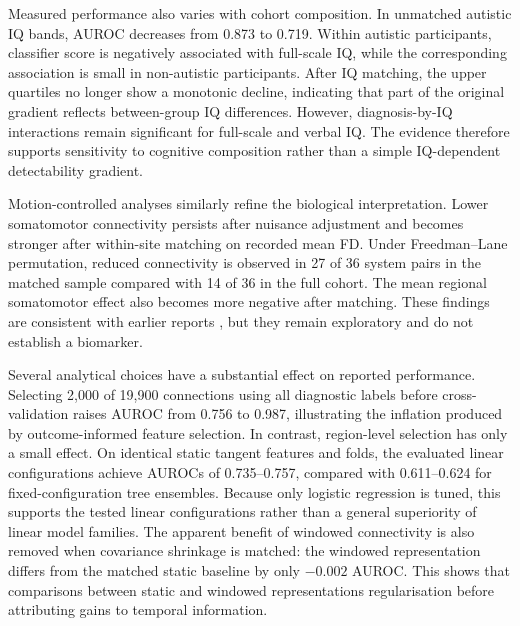 Measured performance also varies with cohort composition. In unmatched autistic IQ bands, AUROC decreases from 0.873 to 0.719. Within autistic participants, classifier score is negatively associated with full-scale IQ, while the corresponding association is small in non-autistic participants. After IQ matching, the upper quartiles no longer show a monotonic decline, indicating that part of the original gradient reflects between-group IQ differences. However, diagnosis-by-IQ interactions remain significant for full-scale and verbal IQ. The evidence therefore supports sensitivity to cognitive composition rather than a simple IQ-dependent detectability gradient.

Motion-controlled analyses similarly refine the biological interpretation. Lower somatomotor connectivity persists after nuisance adjustment and becomes stronger after within-site matching on recorded mean FD. Under Freedman--Lane permutation, reduced connectivity is observed in 27 of 36 system pairs in the matched sample compared with 14 of 36 in the full cohort. The mean regional somatomotor effect also becomes more negative after matching. These findings are consistent with earlier reports \citep{Chenetal2015,Holigaetal2019,Ilioskaetal2023}, but they remain exploratory and do not establish a biomarker.

Several analytical choices have a substantial effect on reported performance. Selecting 2,000 of 19,900 connections using all diagnostic labels before cross-validation raises AUROC from 0.756 to 0.987, illustrating the inflation produced by outcome-informed feature selection. In contrast, region-level selection has only a small effect.  On identical static tangent features and folds, the evaluated linear configurations achieve AUROCs of 0.735--0.757, compared with 0.611--0.624 for fixed-configuration tree ensembles. Because only logistic regression is tuned, this supports the tested linear configurations rather than a general superiority of linear model families. The apparent benefit of windowed connectivity is also removed when covariance shrinkage is matched: the windowed representation differs from the matched static baseline by only $-0.002$ AUROC. This shows that comparisons between static and windowed representations  regularisation before attributing gains to temporal information.


